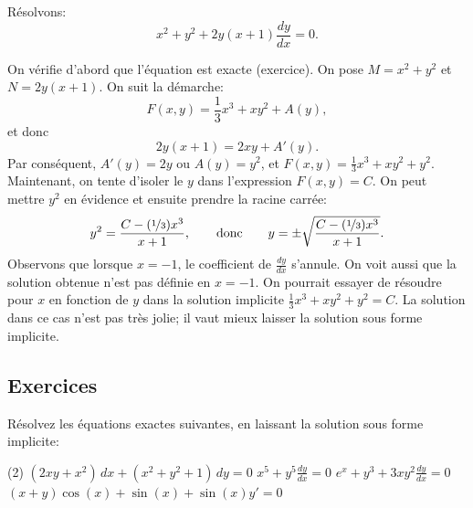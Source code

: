 \begin{example} \label{exact:exampleabove}
	Résolvons:
	\begin{equation*}
		x^2+y^2 + 2y(x+1) \frac{dy}{dx} = 0 .
	\end{equation*}

	On vérifie d'abord que l'équation est exacte (exercice).
	On pose $M= x^2+y^2$ et $N=2y(x+1)$.
	On suit la démarche:
	\begin{equation*}
		F(x, y) = \frac{1}{3}x^3 + xy^2 + A(y),
	\end{equation*}
	et  donc
	\begin{equation*}
		2y(x+1) = 2xy + A'(y) .
	\end{equation*}
	Par conséquent, $A'(y) = 2y$ ou $A(y) = y^2$, et $F(x,y) = \frac{1}{3}x^3 + xy^2 + y^2$.
	Maintenant, on tente d'isoler le $y$ dans l'expression $F(x,y) = C$.  On peut mettre $y^2$ en évidence et ensuite prendre la racine carrée:
	\begin{equation*}
		y^2 = \frac{C-(\nicefrac{1}{3})x^3}{x+1},\qquad \text{donc} \qquad 	y = \pm \sqrt{\frac{C-(\nicefrac{1}{3})x^3}{x+1}}.
	\end{equation*}
	Observons que lorsque $x=-1$, le coefficient de $\frac{dy}{dx}$ s'annule.
	On voit aussi que la solution obtenue n'est pas définie en $x=-1$.
	On pourrait essayer de résoudre pour $x$ en fonction de $y$ dans la solution implicite $\frac{1}{3}x^3 + xy^2 + y^2 = C$.
	La solution dans ce cas n'est pas très jolie; il vaut mieux laisser la solution sous forme implicite.
\end{example}



\subsection{Exercices}

\begin{exercise}
	Résolvez les équations exactes suivantes, en laissant la solution sous forme implicite:
	\begin{tasks}(2)
		\task $(2 xy + x^2) \, dx + (x^2+y^2+1) \, dy = 0$
		\task $x^5 + y^5 \frac{dy}{dx} = 0$
		\task $e^x+y^3 + 3xy^2 \frac{dy}{dx} = 0$
		\task $(x+y)\cos(x)+\sin(x) + \sin(x)y' = 0$
	\end{tasks}
\end{exercise}


